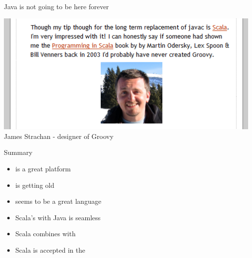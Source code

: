 \begin{frame}{Java is not going to be here forever}
\begin{center}
\includegraphics[scale=0.8]{resources/JamesStrachanScala.png}\\
James Strachan - designer of Groovy
\end{center}
\end{frame}

\begin{frame}{Summary}
\begin{itemize}
  \item {} is a great platform
  \item {} is getting old
  \item {} seems to be a great language
  \item Scala's  with Java is seamless
  \item Scala combines  with 
  \item Scala is accepted in the 
\end{itemize}
\end{frame}







